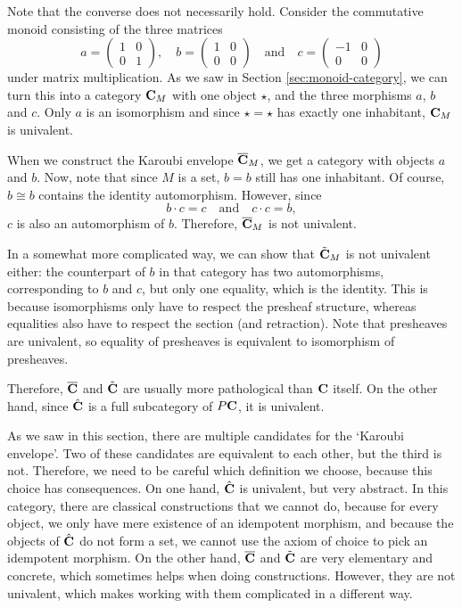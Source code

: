\begin{remark}
  Note that the converse does not necessarily hold. Consider the commutative monoid consisting of the three matrices
  \[
    a = \begin{pmatrix}
      1 & 0\\0 & 1
    \end{pmatrix}, \quad
    b = \begin{pmatrix}
      1 & 0\\0 & 0
    \end{pmatrix} \quad \text{and} \quad
    c = \begin{pmatrix}
      -1 & 0\\0 & 0
    \end{pmatrix}
  \]
  under matrix multiplication. As we saw in Section \ref{sec:monoid-category}, we can turn this into a category $ \mathbf{C}_M $ with one object $ \star $, and the three morphisms $ a $, $ b $ and $ c $. Only $ a $ is an isomorphism and since $ \star = \star $ has exactly one inhabitant, $ \mathbf{C}_M $ is univalent.

  When we construct the Karoubi envelope $ \overline {\mathbf{C}}_M $, we get a category with objects $ a $ and $ b $. Now, note that since $ M $ is a set, $ b = b $ still has one inhabitant. Of course, $ b \cong b $ contains the identity automorphism. However, since
  \[ b \cdot c = c \quad \text{and} \quad c \cdot c = b, \]
  $ c $ is also an automorphism of $ b $. Therefore, $ \overline {\mathbf{C}}_M $ is not univalent.

  In a somewhat more complicated way, we can show that $ \tilde {\mathbf{C}}_M $ is not univalent either: the counterpart of $ b $ in that category has two automorphisms, corresponding to $ b $ and $ c $, but only one equality, which is the identity. This is because isomorphisms only have to respect the presheaf structure, whereas equalities also have to respect the section (and retraction). Note that presheaves are univalent, so equality of presheaves is equivalent to isomorphism of presheaves.

  Therefore, $ \overline {\mathbf{C}} $ and $ \tilde {\mathbf{C}} $ are usually more pathological than $ \mathbf{C} $ itself. On the other hand, since $ \hat {\mathbf{C}} $ is a full subcategory of $ P\mathbf{C} $, it is univalent.
\end{remark}

\begin{remark}\label{rem:karoubi-candidate-choice}
  As we saw in this section, there are multiple candidates for the `Karoubi envelope'. Two of these candidates are equivalent to each other, but the third is not. Therefore, we need to be careful which definition we choose, because this choice has consequences. On one hand, $ \hat {\mathbf{C}} $ is univalent, but very abstract. In this category, there are classical constructions that we cannot do, because for every object, we only have mere existence of an idempotent morphism, and because the objects of $ \hat {\mathbf{C}} $ do not form a set, we cannot use the axiom of choice to pick an idempotent morphism. On the other hand, $ \overline {\mathbf{C}} $ and $ \tilde {\mathbf{C}} $ are very elementary and concrete, which sometimes helps when doing constructions. However, they are not univalent, which makes working with them complicated in a different way.
\end{remark}

